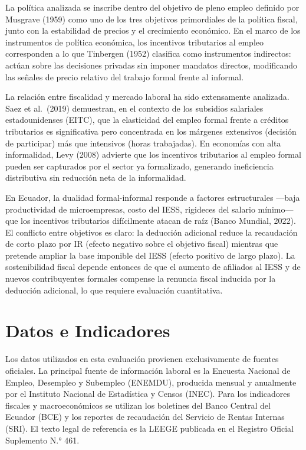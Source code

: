 \documentclass[12pt,spanish]{article}
\begin{document}
La política analizada se inscribe dentro del objetivo de pleno empleo
definido por Musgrave (1959) como uno de los tres objetivos primordiales
de la política fiscal, junto con la estabilidad de precios y el
crecimiento económico. En el marco de los instrumentos de política
económica, los incentivos tributarios al empleo corresponden a lo que
Tinbergen (1952) clasifica como instrumentos indirectos: actúan sobre
las decisiones privadas sin imponer mandatos directos, modificando las
señales de precio relativo del trabajo formal frente al informal.

La relación entre fiscalidad y mercado laboral ha sido extensamente
analizada. Saez et al.~(2019) demuestran, en el contexto de los
subsidios salariales estadounidenses (EITC), que la elasticidad del
empleo formal frente a créditos tributarios es significativa pero
concentrada en los márgenes extensivos (decisión de participar) más que
intensivos (horas trabajadas). En economías con alta informalidad, Levy
(2008) advierte que los incentivos tributarios al empleo formal pueden
ser capturados por el sector ya formalizado, generando ineficiencia
distributiva sin reducción neta de la informalidad.

En Ecuador, la dualidad formal-informal responde a factores
estructurales ---baja productividad de microempresas, costo del IESS,
rigideces del salario mínimo--- que los incentivos tributarios
difícilmente atacan de raíz (Banco Mundial, 2022). El conflicto entre
objetivos es claro: la deducción adicional reduce la recaudación de
corto plazo por IR (efecto negativo sobre el objetivo fiscal) mientras
que pretende ampliar la base imponible del IESS (efecto positivo de
largo plazo). La sostenibilidad fiscal depende entonces de que el
aumento de afiliados al IESS y de nuevos contribuyentes formales
compense la renuncia fiscal inducida por la deducción adicional, lo que
requiere evaluación cuantitativa.

\section{Datos e Indicadores}\label{datos-e-indicadores}

Los datos utilizados en esta evaluación provienen exclusivamente de
fuentes oficiales. La principal fuente de información laboral es la
Encuesta Nacional de Empleo, Desempleo y Subempleo (ENEMDU), producida
mensual y anualmente por el Instituto Nacional de Estadística y Censos
(INEC). Para los indicadores fiscales y macroeconómicos se utilizan los
boletines del Banco Central del Ecuador (BCE) y los reportes de
recaudación del Servicio de Rentas Internas (SRI). El texto legal de
referencia es la LEEGE publicada en el Registro Oficial Suplemento N.°
461.
\end{document}
